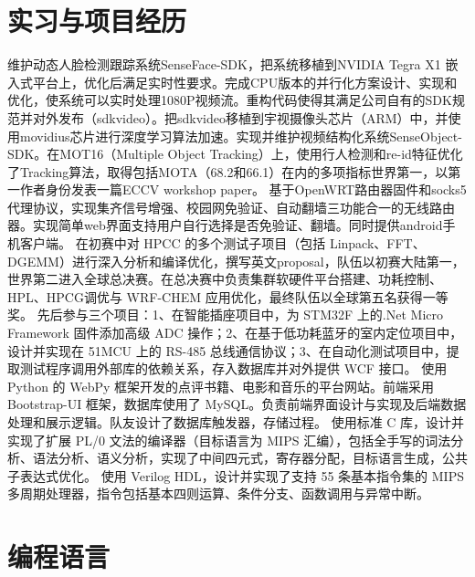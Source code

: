 \documentclass[11pt,a4paper]{moderncv}
\begin{document}
\section{实习与项目经历}
{维护动态人脸检测跟踪系统SenseFace-SDK，把系统移植到NVIDIA Tegra X1 嵌入式平台上，优化后满足实时性要求。完成CPU版本的并行化方案设计、实现和优化，使系统可以实时处理1080P视频流。重构代码使得其满足公司自有的SDK规范并对外发布（sdkvideo）。把sdkvideo移植到宇视摄像头芯片（ARM）中，并使用movidius芯片进行深度学习算法加速。实现并维护视频结构化系统SenseObject-SDK。在MOT16（Multiple Object Tracking）上，使用行人检测和re-id特征优化了Tracking算法，取得包括MOTA（68.2和66.1）在内的多项指标世界第一，以第一作者身份发表一篇ECCV workshop paper。}  
{基于OpenWRT路由器固件和socks5代理协议，实现集齐信号增强、校园网免验证、自动翻墙三功能合一的无线路由器。实现简单web界面支持用户自行选择是否免验证、翻墙。同时提供android手机客户端。}
{在初赛中对 HPCC 的多个测试子项目（包括 Linpack、FFT、DGEMM）进行深入分析和编译优化，撰写英文proposal，队伍以初赛大陆第一，世界第二进入全球总决赛。在总决赛中负责集群软硬件平台搭建、功耗控制、HPL、HPCG调优与 WRF-CHEM 应用优化，最终队伍以全球第五名获得一等奖。} 
{先后参与三个项目：1、在智能插座项目中，为 STM32F 上的.Net Micro Framework 固件添加高级 ADC 操作；2、在基于低功耗蓝牙的室内定位项目中，设计并实现在 51MCU 上的 RS-485 总线通信协议；3、在自动化测试项目中，提取测试程序调用外部库的依赖关系，存入数据库并对外提供 WCF 接口。} 
{使用 Python 的 WebPy 框架开发的点评书籍、电影和音乐的平台网站。前端采用 Bootstrap-UI 框架，数据库使用了 MySQL。负责前端界面设计与实现及后端数据处理和展示逻辑。队友设计了数据库触发器，存储过程。} 
{使用标准 C 库，设计并实现了扩展 PL/0 文法的编译器（目标语言为 MIPS 汇编），包括全手写的词法分析、语法分析、语义分析，实现了中间四元式，寄存器分配，目标语言生成，公共子表达式优化。} 
{使用 Verilog HDL，设计并实现了支持 55 条基本指令集的 MIPS 多周期处理器，指令包括基本四则运算、条件分支、函数调用与异常中断。} 
\section{编程语言}
\end{document}
